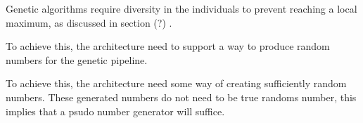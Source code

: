 Genetic algorithms require diversity in the individuals to prevent reaching a local maximum, as discussed in section (?) . 

To achieve this, the architecture need to support a way to produce random numbers for the genetic pipeline.   

To achieve this, the architecture need some way of creating sufficiently random numbers. These generated numbers do not need to be true randoms number, this implies that a psudo number generator will suffice. 

